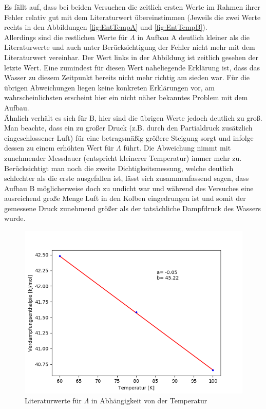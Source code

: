 \documentclass[12pt,a4paper]{article}
\begin{document}
Es fällt auf, dass bei beiden Versuchen die zeitlich ersten Werte im Rahmen ihrer Fehler relativ gut mit dem Literaturwert übereinstimmen (Jeweils die zwei Werte rechts in den Abbildungen \ref{fig:EntTempA} und \ref{fig:EntTempB}).\\
Allerdings sind die restlichen Werte für $\Lambda$ in Aufbau A deutlich kleiner als die Literaturwerte und auch unter Berücksichtigung der Fehler nicht mehr mit dem Literaturwert vereinbar. Der Wert links in der Abbildung ist zeitlich gesehen der letzte Wert. Eine zumindest für diesen Wert naheliegende Erklärung ist, dass das Wasser zu diesem Zeitpunkt bereits nicht mehr richtig am sieden war. Für die übrigen Abweichungen liegen keine konkreten Erklärungen vor, am wahrscheinlichsten erscheint hier ein nicht näher bekanntes Problem mit dem Aufbau. \\
Ähnlich verhält es sich für B, hier sind die übrigen Werte jedoch deutlich zu groß.\\
Man beachte, dass ein zu großer Druck (z.B. durch den Partialdruck zusätzlich eingeschlossener Luft) für eine betragsmäßig größere Steigung sorgt und infolge dessen zu einem erhöhten Wert für $\Lambda$ führt.
Die Abweichung nimmt mit zunehmender Messdauer (entspricht kleinerer Temperatur) immer mehr zu. Berücksichtigt man noch die zweite Dichtigkeitsmessung, welche deutlich schlechter als die erste ausgefallen ist, lässt sich zusammenfassend sagen, dass Aufbau B möglicherweise doch zu undicht war und während des Versuches eine ausreichend große Menge Luft in den Kolben eingedrungen ist und somit der gemessene Druck zunehmend größer als der tatsächliche Dampfdruck des Wassers wurde.\\





\begin{figure}[H]
\begin{center}
\includegraphics[scale=0.9]{Bilder/Lambda_Literaturwert_fit.png}
\caption[Literaturwerte für $\Lambda$ in Abhängigkeit von der Temperatur]{Literaturwerte für $\Lambda$ in Abhängigkeit von der Temperatur}
\label{fig:LiteraturwertLambda}
\end{center}
\end{figure}
\end{document}

